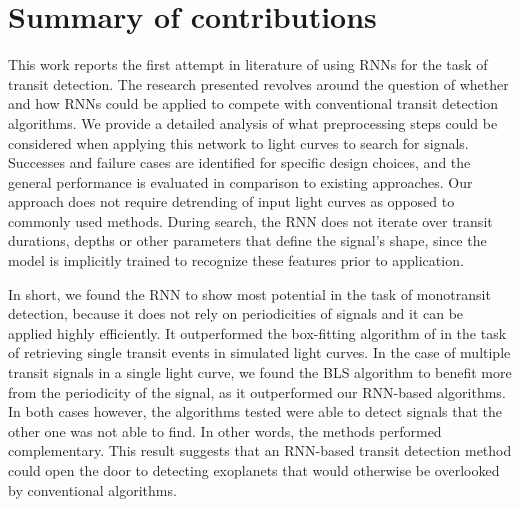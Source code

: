 
\section{Summary of contributions}
\label{sec:contributions}

This work reports the first attempt in literature of using RNNs for the task of transit detection. The research presented revolves around the question of whether and how RNNs could be applied to compete with conventional transit detection algorithms. We provide a detailed analysis of what preprocessing steps could be considered when applying this network to light curves to search for signals. Successes and failure cases are identified for specific design choices, and the general performance is evaluated in comparison to existing approaches. Our approach does not require detrending of input light curves as opposed to commonly used methods. During search, the RNN does not iterate over transit durations, depths or other parameters that define the signal's shape, since the model is implicitly trained to recognize these features prior to application.

In short, we found the RNN to show most potential in the task of monotransit detection, because it does not rely on periodicities of signals and it can be applied highly efficiently. It outperformed the box-fitting algorithm of \cite{foreman2016population} in the task of retrieving single transit events in simulated light curves. In the case of multiple transit signals in a single light curve, we found the BLS algorithm to benefit more from the periodicity of the signal, as it outperformed our RNN-based algorithms. In both cases however, the algorithms tested were able to detect signals that the other one was not able to find. In other words, the methods performed complementary. This result suggests that an RNN-based transit detection method could open the door to detecting exoplanets that would otherwise be overlooked by conventional algorithms.